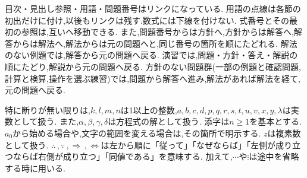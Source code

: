 \begin{bookcolumns}
  目次・見出し参照・用語・問題番号はリンクになっている.
  用語の点線は各節の初出だけに付け,以後もリンクは残す.数式には下線を付けない.
  式番号とその最初の参照は,互いへ移動できる.
  また,問題番号からは方針へ,方針からは解答へ,解答からは解法へ,解法からは元の問題へと,同じ番号の箇所を順にたどれる.
  解法のない例題では,解答から元の問題へ戻る.
  演習では,問題・方針・答え・解説の順にたどり,解説から元の問題へ戻る.
  方針のない問題群(一部の例題と確認問題,計算と検算,操作を選ぶ練習)では,問題から解答へ進み,解法があれば解法を経て,元の問題へ戻る.

  特に断りが無い限りは,$k,l,m,n$は1以上の整数,$a,b,c,d,p,q,r,s,t,u,v,x,y,\lambda$は実数として扱う.
  また,$\alpha,\beta,\gamma,\delta$は方程式の解として扱う.
  添字は$n\ge1$を基本とする.$a_0$から始める場合や,文字の範囲を変える場合は,その箇所で明示する.
  $z$は複素数として扱う.
  $\therefore\,,\because\,,\Rightarrow\,,\Leftrightarrow$は左から順に「従って」「なぜならば」「左側が成り立つならば右側が成り立つ」「同値である」を意味する.
  加えて,$\cdots$や$\vdots$は途中を省略する時に用いる.

\end{bookcolumns}
